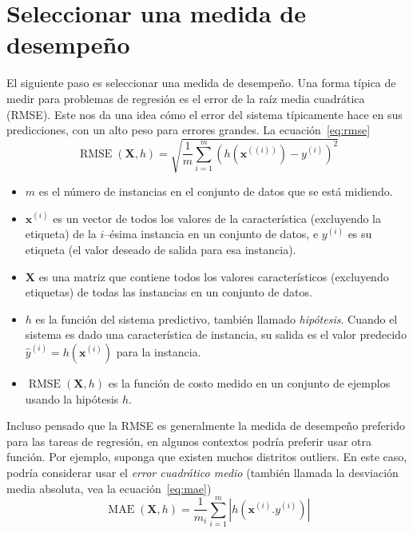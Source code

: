 \section{Seleccionar una medida de desempeño}

El siguiente paso es seleccionar una medida de desempeño. Una forma típica de medir para problemas de regresión es el error de la raíz media cuadrática (RMSE). Este nos da una idea cómo el error del sistema típicamente hace en sus predicciones, con un alto peso para errores grandes. La ecuación~\eqref{eq:rmse}
\begin{equation}\label{eq:rmse}
\operatorname{RMSE}\left(\bm{X},h\right)=\sqrt{\frac{1}{m}\sum_{i=1}^{m}{\left(h\left(\bm{x}^{\left((i)\right)}\right)-y^{\left(i\right)}\right)}^{2}}
\end{equation}
\begin{itemize}
	\item $m$ es el número de instancias en el conjunto de datos que se está midiendo.
	\item $\bm{x}^{\left(i\right)}$ es un vector de todos los valores de la característica (excluyendo la etiqueta) de la $i$--ésima instancia en un conjunto de datos, e $y^{\left(i\right)}$ es su etiqueta (el valor deseado de salida para esa instancia).
	\item $\bm{X}$ es una matriz que contiene todos los valores característicos (excluyendo etiquetas) de todas las instancias en un conjunto de datos.
	\item $h$ es la función del sistema predictivo, también llamado \emph{hipótesis}. Cuando el sistema es dado una característica de instancia, su salida es el valor predecido $\hat{y}^{\left(i\right)}=h\left(\bm{x}^{\left(i\right)}\right)$ para la instancia.
	\item $\operatorname{RMSE}\left(\bm{X},h\right)$ es la función de costo medido en un conjunto de ejemplos usando la hipótesis $h$.
\end{itemize}
Incluso pensado que la RMSE es generalmente la medida de desempeño preferido para las tareas de regresión, en algunos contextos podría preferir usar otra función. Por ejemplo, suponga que existen muchos distritos outliers. En este caso, podría considerar usar el \emph{error cuadrático medio} (también llamada la desviación media absoluta, vea la ecuación~\eqref{eq:mae})
\begin{equation}\label{eq:mae}
\operatorname{MAE}\left(\bm{X},h\right)=\frac{1}{m_{i}}\sum_{i=1}^{m}\left|h\left(\bm{x}^{\left(i\right)}.y^{\left(i\right)}\right)\right|
\end{equation}
